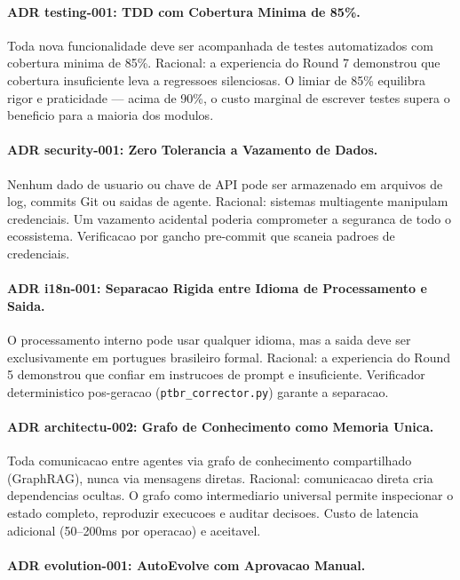 \paragraph{ADR testing-001: TDD com Cobertura Minima de 85\%.}

Toda nova funcionalidade deve ser acompanhada de testes automatizados com
cobertura minima de 85\%. Racional: a experiencia do Round 7 demonstrou
que cobertura insuficiente leva a regressoes silenciosas. O limiar de 85\%
equilibra rigor e praticidade --- acima de 90\%, o custo marginal de
escrever testes supera o beneficio para a maioria dos modulos.

\paragraph{ADR security-001: Zero Tolerancia a Vazamento de Dados.}

Nenhum dado de usuario ou chave de API pode ser armazenado em arquivos
de log, commits Git ou saidas de agente. Racional: sistemas multiagente
manipulam credenciais. Um vazamento acidental poderia comprometer a
seguranca de todo o ecossistema. Verificacao por gancho pre-commit que
scaneia padroes de credenciais.

\paragraph{ADR i18n-001: Separacao Rigida entre Idioma de Processamento e Saida.}

O processamento interno pode usar qualquer idioma, mas a saida deve ser
exclusivamente em portugues brasileiro formal. Racional: a experiencia
do Round 5 demonstrou que confiar em instrucoes de prompt e insuficiente.
Verificador deterministico pos-geracao (\texttt{ptbr\_corrector.py})
garante a separacao.

\paragraph{ADR architectu-002: Grafo de Conhecimento como Memoria Unica.}

Toda comunicacao entre agentes via grafo de conhecimento compartilhado
(GraphRAG), nunca via mensagens diretas. Racional: comunicacao direta
cria dependencias ocultas. O grafo como intermediario universal permite
inspecionar o estado completo, reproduzir execucoes e auditar decisoes.
Custo de latencia adicional (50--200ms por operacao) e aceitavel.

\paragraph{ADR evolution-001: AutoEvolve com Aprovacao Manual.}

